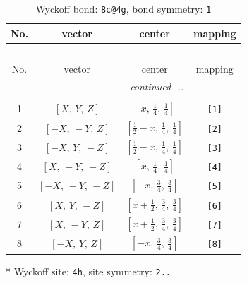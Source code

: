 \documentclass[fleqn,8pt]{jsarticle}
\begin{document}
\renewcommand{\arraystretch}{1.2}
\begin{longtable}{cccc}
\caption{Wyckoff bond: {\tt 8c@4g}, bond symmetry: {\tt 1}}
 \\
 \hline \hline
No. & vector & center & mapping \\ \hline \endfirsthead

\multicolumn{3}{l}{\tablename\ \thetable{}} \\
 \hline \hline
No. & vector & center & mapping \\ \hline \endhead

 \hline \hline
\multicolumn{3}{r}{\footnotesize\it continued ...} \\ \endfoot

 \hline \hline
\multicolumn{3}{r}{} \\ \endlastfoot

1 & $\left[ X,\, Y,\, Z \right]$ & $\left[ x,\, \frac{1}{4},\, \frac{1}{4} \right]$ & {\tt [1]} \\ \hline
2 & $\left[ - X,\, - Y,\, Z \right]$ & $\left[ \frac{1}{2} - x,\, \frac{1}{4},\, \frac{1}{4} \right]$ & {\tt [2]} \\ \hline
3 & $\left[ - X,\, Y,\, - Z \right]$ & $\left[ \frac{1}{2} - x,\, \frac{1}{4},\, \frac{1}{4} \right]$ & {\tt [3]} \\ \hline
4 & $\left[ X,\, - Y,\, - Z \right]$ & $\left[ x,\, \frac{1}{4},\, \frac{1}{4} \right]$ & {\tt [4]} \\ \hline
5 & $\left[ - X,\, - Y,\, - Z \right]$ & $\left[ - x,\, \frac{3}{4},\, \frac{3}{4} \right]$ & {\tt [5]} \\ \hline
6 & $\left[ X,\, Y,\, - Z \right]$ & $\left[ x + \frac{1}{2},\, \frac{3}{4},\, \frac{3}{4} \right]$ & {\tt [6]} \\ \hline
7 & $\left[ X,\, - Y,\, Z \right]$ & $\left[ x + \frac{1}{2},\, \frac{3}{4},\, \frac{3}{4} \right]$ & {\tt [7]} \\ \hline
8 & $\left[ - X,\, Y,\, Z \right]$ & $\left[ - x,\, \frac{3}{4},\, \frac{3}{4} \right]$ & {\tt [8]} \\
\end{longtable}
* Wyckoff site: {\tt 4h}, site symmetry: {\tt 2..}
\renewcommand{\arraystretch}{1.2}
\end{document}
